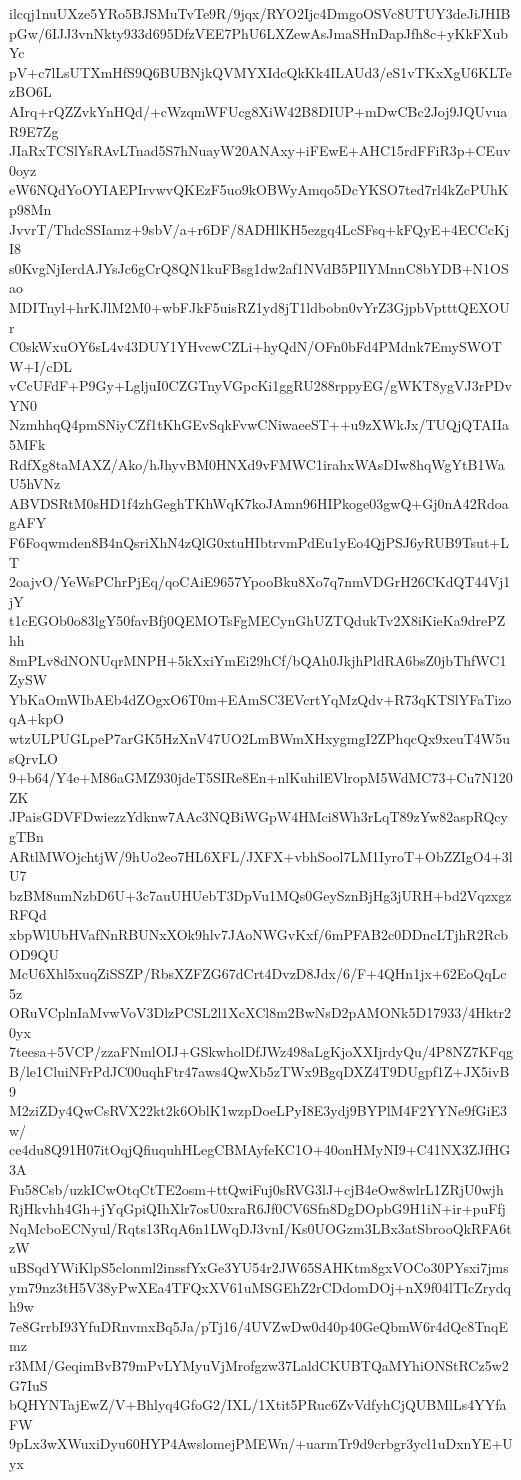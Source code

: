 ilcqj1nuUXze5YRo5BJSMuTvTe9R/9jqx/RYO2Ijc4DmgoOSVc8UTUY3deJiJHIB
pGw/6IJJ3vnNkty933d695DfzVEE7PhU6LXZewAsJmaSHnDapJfh8c+yKkFXubYc
pV+c7lLsUTXmHfS9Q6BUBNjkQVMYXIdcQkKk4ILAUd3/eS1vTKxXgU6KLTezBO6L
AIrq+rQZZvkYnHQd/+cWzqmWFUcg8XiW42B8DIUP+mDwCBc2Joj9JQUvuaR9E7Zg
JIaRxTCSlYsRAvLTnad5S7hNuayW20ANAxy+iFEwE+AHC15rdFFiR3p+CEuv0oyz
eW6NQdYoOYIAEPIrvwvQKEzF5uo9kOBWyAmqo5DcYKSO7ted7rl4kZcPUhKp98Mn
JvvrT/ThdcSSIamz+9sbV/a+r6DF/8ADHlKH5ezgq4LcSFsq+kFQyE+4ECCcKjI8
s0KvgNjIerdAJYsJc6gCrQ8QN1kuFBsg1dw2af1NVdB5PIlYMnnC8bYDB+N1OSao
MDITnyl+hrKJlM2M0+wbFJkF5uisRZ1yd8jT1ldbobn0vYrZ3GjpbVptttQEXOUr
C0skWxuOY6sL4v43DUY1YHvcwCZLi+hyQdN/OFn0bFd4PMdnk7EmySWOTW+I/cDL
vCcUFdF+P9Gy+LgljuI0CZGTnyVGpcKi1ggRU288rppyEG/gWKT8ygVJ3rPDvYN0
NzmhhqQ4pmSNiyCZf1tKhGEvSqkFvwCNiwaeeST++u9zXWkJx/TUQjQTAIIa5MFk
RdfXg8taMAXZ/Ako/hJhyvBM0HNXd9vFMWC1irahxWAsDIw8hqWgYtB1WaU5hVNz
ABVDSRtM0sHD1f4zhGeghTKhWqK7koJAmn96HIPkoge03gwQ+Gj0nA42RdoagAFY
F6Foqwmden8B4nQsriXhN4zQlG0xtuHIbtrvmPdEu1yEo4QjPSJ6yRUB9Tsut+LT
2oajvO/YeWsPChrPjEq/qoCAiE9657YpooBku8Xo7q7nmVDGrH26CKdQT44Vj1jY
t1cEGOb0o83lgY50favBfj0QEMOTsFgMECynGhUZTQdukTv2X8iKieKa9drePZhh
8mPLv8dNONUqrMNPH+5kXxiYmEi29hCf/bQAh0JkjhPldRA6bsZ0jbThfWC1ZySW
YbKaOmWIbAEb4dZOgxO6T0m+EAmSC3EVcrtYqMzQdv+R73qKTSlYFaTizoqA+kpO
wtzULPUGLpeP7arGK5HzXnV47UO2LmBWmXHxygmgI2ZPhqcQx9xeuT4W5usQrvLO
9+b64/Y4e+M86aGMZ930jdeT5SIRe8En+nlKuhilEVlropM5WdMC73+Cu7N120ZK
JPaisGDVFDwiezzYdknw7AAc3NQBiWGpW4HMci8Wh3rLqT89zYw82aspRQcygTBn
ARtlMWOjchtjW/9hUo2eo7HL6XFL/JXFX+vbhSool7LM1IyroT+ObZZIgO4+3lU7
bzBM8umNzbD6U+3c7auUHUebT3DpVu1MQs0GeySznBjHg3jURH+bd2VqzxgzRFQd
xbpWlUbHVafNnRBUNxXOk9hlv7JAoNWGvKxf/6mPFAB2c0DDncLTjhR2RcbOD9QU
McU6Xhl5xuqZiSSZP/RbsXZFZG67dCrt4DvzD8Jdx/6/F+4QHn1jx+62EoQqLc5z
ORuVCplnIaMvwVoV3DlzPCSL2l1XcXCl8m2BwNsD2pAMONk5D17933/4Hktr20yx
7teesa+5VCP/zzaFNmlOIJ+GSkwholDfJWz498aLgKjoXXIjrdyQu/4P8NZ7KFqg
B/le1CluiNFrPdJC00uqhFtr47aws4QwXb5zTWx9BgqDXZ4T9DUgpf1Z+JX5ivB9
M2ziZDy4QwCsRVX22kt2k6OblK1wzpDoeLPyI8E3ydj9BYPlM4F2YYNe9fGiE3w/
ce4du8Q91H07itOqjQfiuquhHLegCBMAyfeKC1O+40onHMyNI9+C41NX3ZJfHG3A
Fu58Csb/uzkICwOtqCtTE2osm+ttQwiFuj0sRVG3lJ+cjB4eOw8wlrL1ZRjU0wjh
RjHkvhh4Gh+jYqGpiQIhXlr7osU0xraR6Jf0CV6Sfn8DgDOpbG9H1iN+ir+puFfj
NqMcboECNyul/Rqts13RqA6n1LWqDJ3vnI/Ks0UOGzm3LBx3atSbrooQkRFA6tzW
uBSqdYWiKlpS5clonml2inssfYxGe3YU54r2JW65SAHKtm8gxVOCo30PYsxi7jms
ym79nz3tH5V38yPwXEa4TFQxXV61uMSGEhZ2rCDdomDOj+nX9f04lTIcZrydqh9w
7e8GrrbI93YfuDRnvmxBq5Ja/pTj16/4UVZwDw0d40p40GeQbmW6r4dQc8TnqEmz
r3MM/GeqimBvB79mPvLYMyuVjMrofgzw37LaldCKUBTQaMYhiONStRCz5w2G7IuS
bQHYNTajEwZ/V+Bhlyq4GfoG2/IXL/1Xtit5PRuc6ZvVdfyhCjQUBMlLs4YYfaFW
9pLx3wXWuxiDyu60HYP4AwslomejPMEWn/+uarmTr9d9crbgr3ycl1uDxnYE+Uyx
